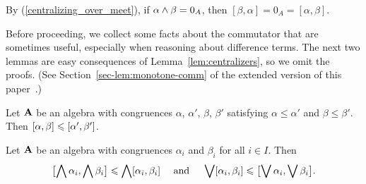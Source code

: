 \begin{rem}
By (\ref{centralizing_over_meet}), 
if $\alpha \wedge \beta = 0_{A}$,  
then %
$[\beta, \alpha] = 0_A = [\alpha, \beta]$.
\end{rem}


Before proceeding, we collect some facts about the commutator that are
sometimes useful, especially when reasoning about difference terms.
The next two lemmas are easy consequences
of Lemma~\ref{lem:centralizers}, so 
we omit the proofs.
(See Section~\ref{sec-lem:monotone-comm}
of the extended version of this paper~\extendedref.)

\begin{lem}
  \label{lem:monotone-comm}
  Let $\mathbf{A}$ be an algebra
  with congruences
  $\alpha$, $\alpha'$, $\beta$, $\beta'$ satisfying
  $\alpha\leq \alpha'$ and $\beta \leq \beta'$.
  Then $[\alpha, \beta] \leqslant [\alpha', \beta']$.
\end{lem}

\begin{lem}
  \label{lem:complete-meet-join-monotone}
Let $\mathbf{A}$ be an algebra with congruences
$\alpha_i$ and 
$\beta_i$ %
for all $i \in I$.
Then
\[
\bigl[ \bigwedge \alpha_i, \bigwedge \beta_i \bigr] \leqslant
\bigwedge [\alpha_i, \beta_i]
\quad \text{ and } \quad
\bigvee [\alpha_i, \beta_i] \leqslant
\bigl[ \bigvee \alpha_i, \bigvee \beta_i\bigr].
\]
\end{lem}


